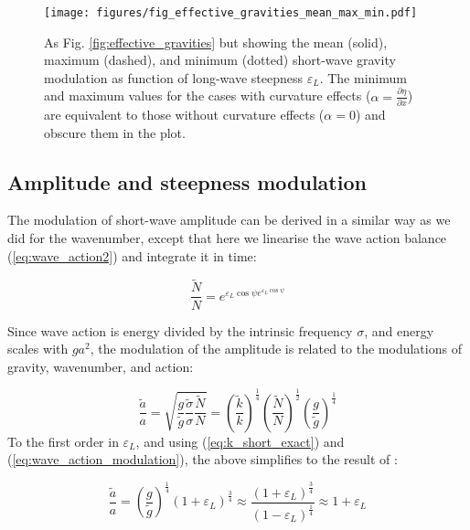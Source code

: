 \documentclass[lineno]{jfm}
\begin{document}
\begin{figure}
\centering
\texttt{[image: figures/fig\_effective\_gravities\_mean\_max\_min.pdf]}
\caption{
  As Fig. \ref{fig:effective_gravities} but showing the mean (solid),
  maximum (dashed), and minimum (dotted) short-wave gravity modulation as
  function of long-wave steepness $\varepsilon_L$.
  The minimum and maximum values for the cases with curvature effects
  ($\alpha=\frac{\partial \eta}{\partial x}$) are equivalent to those without
  curvature effects ($\alpha=0$) and obscure them in the plot.
}
\label{fig:effective_gravities_mean_max_min}
\end{figure}

\subsection{Amplitude and steepness modulation}
\label{subsection:amplitude_modulation}

The modulation of short-wave amplitude can be derived in a similar way as we did
for the wavenumber, except that here we linearise the wave action balance
(\ref{eq:wave_action2}) and integrate it in time:

\begin{equation}
\label{eq:wave_action_modulation}
\frac{\widetilde{N}}{N} = e^{\varepsilon_L \cos{\psi} e^{\varepsilon_L \cos{\psi}}}
\end{equation}

Since wave action is energy divided by the intrinsic frequency $\sigma$,
and energy scales with $ga^2$, the modulation of the amplitude is related to the
modulations of gravity, wavenumber, and action:

\begin{equation}
\label{eq:wave_amplitude_modulation}
\dfrac{\widetilde{a}}{a} = \sqrt{
  \dfrac{g}{\widetilde{g}}
  \dfrac{\widetilde{\sigma}}{\sigma}
  \dfrac{\widetilde{N}}{N}}
=
  \left( \dfrac{\widetilde{k}}{k} \right)^{\frac{1}{4}}
  \left( \dfrac{\widetilde{N}}{N} \right)^{\frac{1}{2}}
  \left( \dfrac{g}{\widetilde{g}} \right)^{\frac{1}{4}}
\end{equation}
To the first order in $\varepsilon_L$, and using (\ref{eq:k_short_exact})
and (\ref{eq:wave_action_modulation}), the above simplifies to the result of
\citet{longuet1960changes}:

\begin{equation}
\label{eq:wave_amplitude_modulation_order1}
\dfrac{\widetilde{a}}{a} = 
  \left( \dfrac{g}{\widetilde{g}} \right)^{\frac{1}{4}}
  \left( 1 + \varepsilon_L \right)^{\frac{3}{4}}
  \approx \frac{(1 + \varepsilon_L)^{\frac{3}{4}}}{(1 - \varepsilon_L)^{\frac{1}{4}}}
  \approx 1 + \varepsilon_L
\end{equation}
\end{document}
